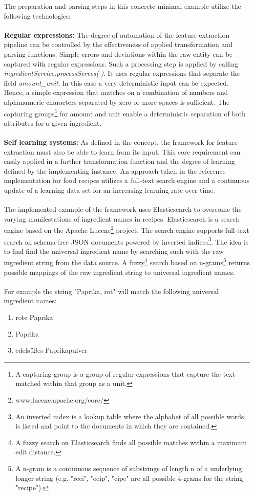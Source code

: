 \noindent The preparation and parsing steps in this concrete minimal example utilize the following technologies:
\\\\
\textbf{Regular expressions:}
The degree of automation of the feature extraction pipeline can be controlled by the effectiveness of applied transformation and parsing functions. Simple errors and deviations within the raw entity can be captured with regular expressions. Such a processing step is applied by calling \textit{ingredientService.processServes($\cdot$)}. It uses regular expressions that separate the field \textit{amount\_unit}. In this case a very deterministic input can be expected. Hence, a simple expression that matches on a combination of numbers and alphanumeric characters separated by zero or more spaces is sufficient. The capturing groups\footnote{A capturing group is a group of regular expressions that capture the text matched within that group as a unit.} for amount and unit enable a deterministic separation of both attributes for a given ingredient.
\\\\
\textbf{Self learning systems:}
As defined in the concept, the framework for feature extraction must also be able to learn from its input. This core requirement can easily applied in a further transformation function and the degree of learning defined by the implementing instance. An approach taken in the reference implementation for food recipes utilizes a full-text search engine and a continuous update of a learning data set for an increasing learning rate over time. 
\\\\
The implemented example of the framework uses Elasticsearch \cite{elasticsearch_2017} to overcome the varying manifestations of ingredient names in recipes. Elasticsearch is a search engine based on the Apache Lucene\footnote{www.lucene.apache.org/core/} project. The search engine supports full-text search on schema-free JSON documents powered by inverted indices\footnote{An inverted index is a lookup table where the alphabet of all possible words is listed and point to the documents in which they are contained.}. The idea is to find find the universal ingredient name by searching such with the raw ingredient string from the data source. A fuzzy\footnote{A fuzzy search on Elasticsearch finds all possible matches within a maximum edit distance.} search based on n-grams\footnote{A n-gram is a continuous sequence of substrings of length n of a underlying longer string (e.g. "reci", "ecip", "cipe" are all possible 4-grams for the string "recipe").} returns possible mappings of the raw ingredient string to universal ingredient names. 
\\\\
For example the string "Paprika, rot" will match the following universal ingredient names:
\begin{enumerate}
\item rote Paprika
\item Paprika
\item edelsüßes Paprikapulver
\end{enumerate}

